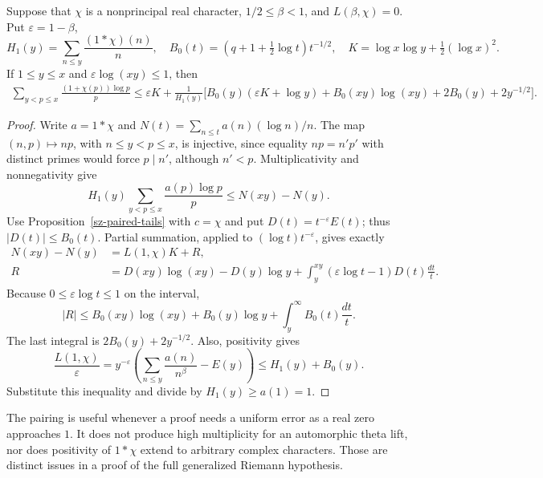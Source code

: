 \begin{lemma}\label{sz-positive}
Suppose that $\chi$ is a nonprincipal real character,
$1/2\le\beta<1$, and $L(\beta,\chi)=0$. Put $\varepsilon=1-\beta$,
\[
 H_1(y)=\sum_{n\le y}\frac{(1*\chi)(n)}n,\quad
 B_0(t)=(q+1+\tfrac12\log t)t^{-1/2},\quad
 K=\log x\log y+\tfrac12(\log x)^2.
\]
If $1\le y\le x$ and $\varepsilon\log(xy)\le1$, then
\begin{align*}
 \sum_{y<p\le x}\frac{(1+\chi(p))\log p}{p}
 \le\varepsilon K+\frac{1}{H_1(y)}
 \bigl[B_0(y)(\varepsilon K+\log y)
       +B_0(xy)\log(xy)+2B_0(y)+2y^{-1/2}\bigr].
\end{align*}
\end{lemma}
\begin{proof}
Write $a=1*\chi$ and $N(t)=\sum_{n\le t}a(n)(\log n)/n$.
The map $(n,p)\mapsto np$, with $n\le y<p\le x$, is injective, since
equality $np=n'p'$ with distinct primes would force $p\mid n'$, although
$n'<p$. Multiplicativity and nonnegativity give
\[
 H_1(y)\sum_{y<p\le x}\frac{a(p)\log p}{p}\le N(xy)-N(y).
\]
Use Proposition~\ref{sz-paired-tails} with $c=\chi$ and put
$D(t)=t^{-\varepsilon}E(t)$; thus $|D(t)|\le B_0(t)$.
Partial summation, applied to $(\log t)t^{-\varepsilon}$, gives exactly
\begin{align*}
 N(xy)-N(y)&=L(1,\chi)K+R,\\
 R&=D(xy)\log(xy)-D(y)\log y
      +\int_y^{xy}(\varepsilon\log t-1)D(t)\frac{dt}{t}.
\end{align*}
Because $0\le\varepsilon\log t\le1$ on the interval,
\[
 |R|\le B_0(xy)\log(xy)+B_0(y)\log y
             +\int_y^\infty B_0(t)\frac{dt}{t}.
\]
The last integral is $2B_0(y)+2y^{-1/2}$. Also, positivity gives
\[
 \frac{L(1,\chi)}\varepsilon
 =y^{-\varepsilon}\left(\sum_{n\le y}\frac{a(n)}{n^\beta}-E(y)\right)
 \le H_1(y)+B_0(y).
\]
Substitute this inequality and divide by $H_1(y)\ge a(1)=1$.
\end{proof}

The pairing is useful whenever a proof needs a uniform error as a real zero
approaches $1$. It does not produce high multiplicity for an automorphic
theta lift, nor does positivity of $1*\chi$ extend to arbitrary complex
characters. Those are distinct issues in a proof of the full generalized
Riemann hypothesis.

